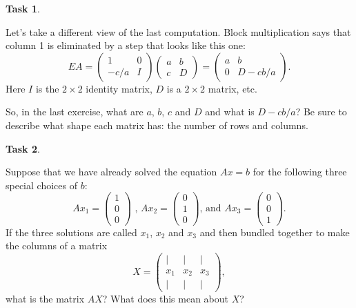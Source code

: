 \documentclass[10pt,]{book}
\theoremstyle{plain}
\theoremstyle{definition}
\numberwithin{equation}{section}
\newtheorem{task}{Task}[chapter]
\begin{document}
\begin{task}
\label{task-60}

          Let's take a different view of the last computation.
          Block multiplication says that column 1 is eliminated by
          a step that looks like this one:
          \[
            EA = \begin{pmatrix} 1 & 0 \\ -c/a & I \end{pmatrix}
            \begin{pmatrix} a & b \\ c & D \end{pmatrix} =
            \begin{pmatrix} a & b \\ 0 & D - cb/a \end{pmatrix}.
          \]
          Here \(I\) is the \(2\times 2\) identity matrix, \(D\) is a
          \(2\times 2\) matrix, etc.
\par

          So, in the last exercise, what are \(a\), \(b\), \(c\)
          and \(D\) and what
          is \(D-cb/a\)? Be sure to describe what shape each matrix has: the
          number of rows and columns.
\end{task}
\begin{task}
\label{task-61}

        Suppose that we have already solved the equation \(Ax=b\) for the
        following three special choices of \(b\):
        \[
          Ax_1 = \begin{pmatrix} 1 \\ 0 \\ 0 \end{pmatrix} \text{ , } Ax_2 = \begin{pmatrix} 0 \\ 1 \\ 0 \end{pmatrix} \text{, and } Ax_3 = \begin{pmatrix} 0 \\ 0 \\ 1 \end{pmatrix}.
        \]
        If the three solutions are called \(x_1\), \(x_2\) and \(x_3\)
        and then bundled together to make the columns of a matrix
        \[X =  \begin{pmatrix} | & | & | \\
          x_1 & x_2 & x_3 \\ | & | & |
          \end{pmatrix},
        \] what is the matrix \(AX\)? What does this mean about \(X\)?
      \end{task}
\clearpage
\typeout{************************************************}
\typeout{************************************************}
\end{document}
